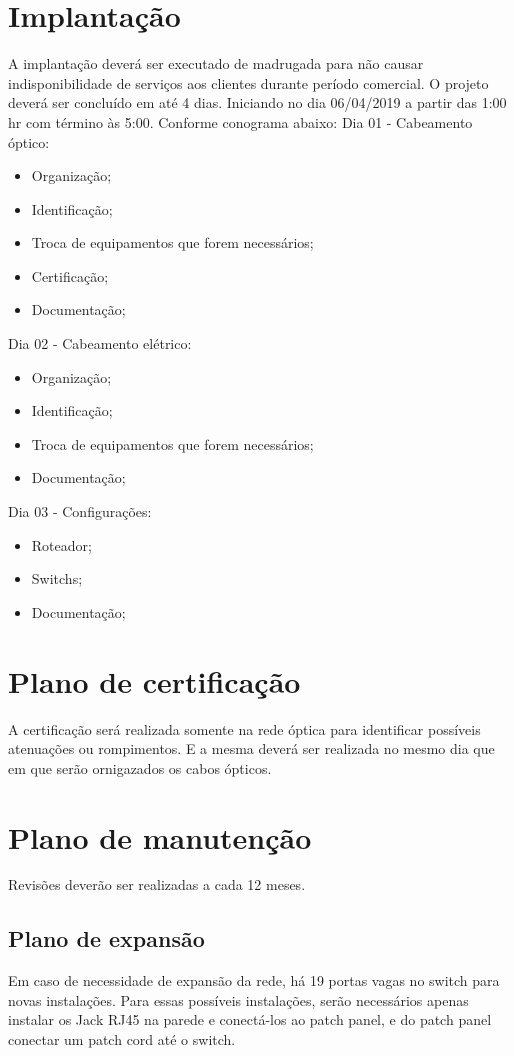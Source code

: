 \documentclass[	DIV=calc,%
paper=a4,%
fontsize=12pt,%
onecolumn]{scrartcl}	 					%
\begin{document}
	\section{Implantação}
	A implantação deverá ser executado de madrugada para não causar indisponibilidade de serviços aos clientes durante período comercial. O projeto deverá ser concluído em até 4 dias.
	Iniciando no dia 06/04/2019 a partir das 1:00 hr com término às 5:00. Conforme conograma abaixo:
	Dia 01 - Cabeamento óptico:
	\begin{itemize}
		\item Organização;
		\item Identificação;
		\item Troca de equipamentos que forem necessários;
		\item Certificação;
		\item Documentação;
	\end{itemize}
	Dia 02 - Cabeamento elétrico:
	\begin{itemize}
		\item Organização;
		\item Identificação;
		\item Troca de equipamentos que forem necessários;		
		\item Documentação;
	\end{itemize}
	Dia 03 - Configurações:
	\begin{itemize}
		\item Roteador;
		\item Switchs;	
		\item Documentação;
	\end{itemize}	
	
	\section{Plano de certificação}
	A certificação será realizada somente na rede óptica para identificar possíveis atenuações ou rompimentos. E a mesma deverá ser realizada no mesmo dia que em que serão ornigazados os cabos ópticos.
	
	\section{Plano de manutenção}
	
	Revisões deverão ser realizadas a cada 12 meses.
	
	\subsection{Plano de expansão}
	Em caso de necessidade de expansão da rede, há 19 portas vagas no switch para novas instalações.  Para essas possíveis instalações, serão necessários apenas instalar os Jack RJ45 na parede e conectá-los ao patch panel, e do patch panel conectar um patch cord até o switch.
	
\end{document}

